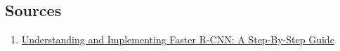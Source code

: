 \subsection{Sources}

\begin{enumerate}
  \item \href{https://towardsdatascience.com/understanding-and-implementing-faster-r-cnn-a-step-by-step-guide-11acfff216b0}{Understanding and Implementing Faster R-CNN: A Step-By-Step Guide}
\end{enumerate}
